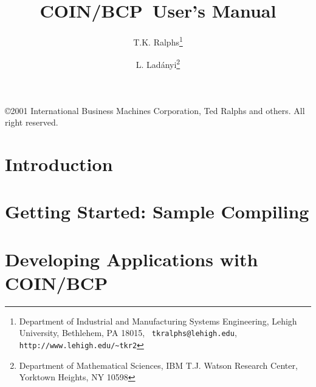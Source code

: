 \documentclass[openany,twoside,11pt]{book}
\newcommand{\BB}{{\sc COIN/BCP}}
\begin{document}
\title{\BB\ User's Manual}
\author{
T.K. Ralphs\thanks{Department of Industrial and Manufacturing Systems 
Engineering, Lehigh University, Bethlehem, PA 18015, {\tt
tkralphs@lehigh.edu}, {\tt http://www.lehigh.edu/\~{ }tkr2}} 
\and
L. Lad\'anyi\thanks{Department of Mathematical Sciences, 
IBM T.J. Watson Research Center, Yorktown Heights,
NY 10598} \\
}
\maketitle

\newpage

\thispagestyle{empty}

\vspace*{3in}
\begin{center}
{\copyright 2001 International Business Machines Corporation, Ted
Ralphs and others. All right reserved.}
\end{center}

\newpage

\tableofcontents


\begin{tabbing}
\end{tabbing}


\chapter{Introduction}
\label{man-intro}



\chapter{Getting Started: Sample Compiling}
\label{getting-started}


\chapter{Developing Applications with \BB}
\label{development}

\end{document}
